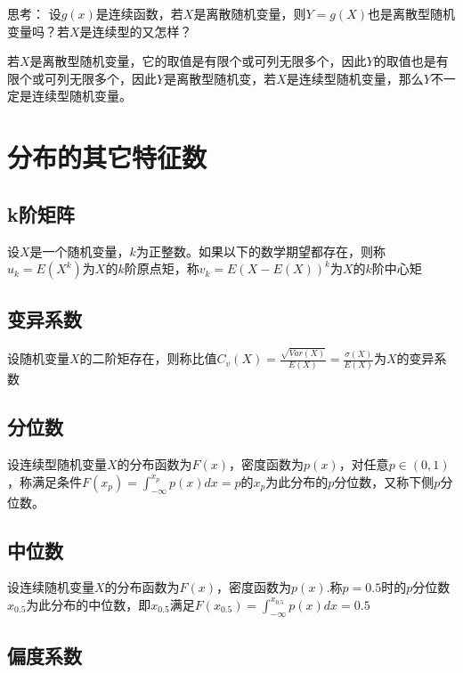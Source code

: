 思考：
设$g(x)$是连续函数，若$X$是离散随机变量，则$Y=g(X)$也是离散型随机变量吗？若$X$是连续型的又怎样？

若$X$是离散型随机变量，它的取值是有限个或可列无限多个，因此$Y$的取值也是有限个或可列无限多个，因此$Y$是离散型随机变，若$X$是连续型随机变量，那么$Y$不一定是连续型随机变量。

\section{分布的其它特征数}
\subsection{k阶矩阵}
\begin{definition}
    设$X$是一个随机变量，$k$为正整数。如果以下的数学期望都存在，则称$u_k=E(X^k)$为$X$的$k$阶原点矩，称$v_k=E(X-E(X))^k$为$X$的$k$阶中心矩
\end{definition}


\subsection{变异系数}
\begin{definition}
    设随机变量$X$的二阶矩存在，则称比值$C_v(X)=\frac{\sqrt{Var(X)}}{E(X)}=\frac{\sigma(X)}{E(X)}$为$X$的变异系数
\end{definition}


\subsection{分位数}
\begin{definition}
    设连续型随机变量$X$的分布函数为$F(x)$，密度函数为$p(x)$，对任意$p \in (0,1)$，称满足条件$F(x_p)=\int_{- \infty}^{x_p}p(x)dx=p$的$x_p$为此分布的$p$分位数，又称下侧$p$分位数。
\end{definition}


\subsection{中位数}
\begin{definition}
    设连续随机变量$X$的分布函数为$F(x)$，密度函数为$p(x)$.称$p=0.5$时的$p$分位数$x_{0.5}$为此分布的中位数，即$x_{0.5}$满足$F(x_{0.5})=\int_{- \infty}^{x_{0.5}}p(x)dx=0.5$
\end{definition}
\subsection{偏度系数}


